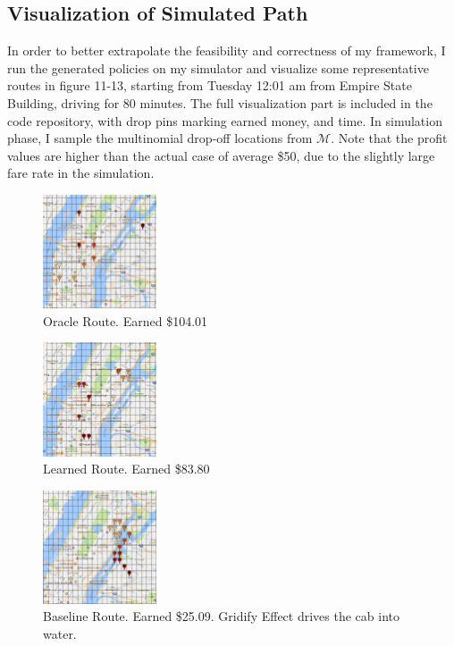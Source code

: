 \documentclass[letterpaper, 10 pt, conference]{ieeeconf}
\begin{document}
\subsection{Visualization of Simulated Path}
In order to better extrapolate the feasibility and correctness of my framework, I run the generated policies on my simulator and visualize some representative routes in figure 11-13, starting from Tuesday 12:01 am from Empire State Building, driving for 80 minutes. The full visualization part is included in the code repository, with drop pins marking earned money, and time. In simulation phase, I sample the multinomial drop-off locations from $\mathcal{M}$. Note that the profit values are higher than the actual case of average \$50, due to the slightly large fare rate in the simulation.
\begin{figure}
\centering
\includegraphics[width=0.3\textwidth]{oracle.png}
\caption{Oracle Route. Earned \$104.01}
\end{figure}
\begin{figure}
\centering
\includegraphics[width=0.3\textwidth]{learned.png}
\caption{Learned Route. Earned \$83.80}
\end{figure}
\begin{figure}
\centering
\includegraphics[width=0.3\textwidth]{baseline.png}
\caption{Baseline Route. Earned \$25.09. Gridify Effect drives the cab into water.}
\end{figure}
\end{document}
